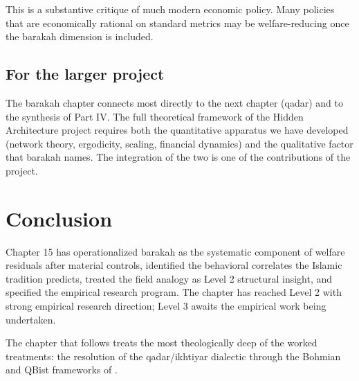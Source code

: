 This is a substantive critique of much modern economic policy.
Many policies that are economically rational on standard metrics
may be welfare-reducing once the barakah dimension is included.

\subsection{For the larger project}

The barakah chapter connects most directly to the next chapter
(qadar) and to the synthesis of Part IV. The full theoretical
framework of the Hidden Architecture project requires both the
quantitative apparatus we have developed (network theory,
ergodicity, scaling, financial dynamics) and the qualitative
factor that barakah names. The integration of the two is one of
the contributions of the project.

\section{Conclusion}

Chapter 15 has operationalized barakah as the systematic component
of welfare residuals after material controls, identified the
behavioral correlates the Islamic tradition predicts, treated the
field analogy as Level 2 structural insight, and specified the
empirical research program. The chapter has reached Level 2 with
strong empirical research direction; Level 3 awaits the empirical
work being undertaken.

The chapter that follows treats the most theologically deep of the
worked treatments: the resolution of the qadar/ikhtiyar dialectic
through the Bohmian and QBist frameworks of .


